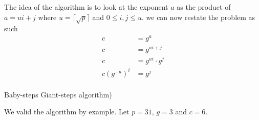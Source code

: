 \noindent
The idea of the algorithm is to look at the exponent $a$ as the product of $a = ui + j$ where $u = \lceil \sqrt{p} \rceil$ and $0 \leq i,j \leq u$. we can now restate the problem as such
\begin{align*}
    c           &= g^a                  \\
    c           &= g^{ui + j}           \\ 
    c           &= g^{ui} \cdot g^{j}   \\
    c( g^{-u} )^i &= g^{j}                \\
\end{align*}


\begin{center}
\begin{algorithm}[H]
\caption{Baby-steps Giant-steps algorithm)  \label{alg:BabyGiant}}



\end{algorithm}
\end{center}

We valid the algorithm by example. Let $p = 31$, $g=3$ and $c = 6$.

